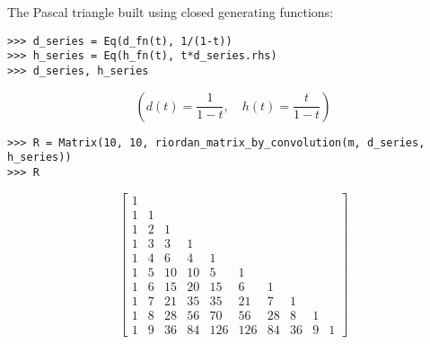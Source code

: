 \begin{example}
The Pascal triangle built using closed generating functions:
\begin{verbatim}
>>> d_series = Eq(d_fn(t), 1/(1-t))
>>> h_series = Eq(h_fn(t), t*d_series.rhs)
>>> d_series, h_series
\end{verbatim}
\begin{displaymath}
\left ( d{\left (t \right )} = \frac{1}{1-t}, \quad h{\left (t \right )} = \frac{t}{1-t}\right )
\end{displaymath}
\begin{verbatim}
>>> R = Matrix(10, 10, riordan_matrix_by_convolution(m, d_series, h_series))
>>> R
\end{verbatim}
\begin{displaymath}
\left[\begin{matrix}1 &   &   &   &   &   &   &   &   &  \\1 & 1 &   &   &   &   &   &   &   &  \\1 & 2 & 1 &   &   &   &   &   &   &  \\1 & 3 & 3 & 1 &   &   &   &   &   &  \\1 & 4 & 6 & 4 & 1 &   &   &   &   &  \\1 & 5 & 10 & 10 & 5 & 1 &   &   &   &  \\1 & 6 & 15 & 20 & 15 & 6 & 1 &   &   &  \\1 & 7 & 21 & 35 & 35 & 21 & 7 & 1 &   &  \\1 & 8 & 28 & 56 & 70 & 56 & 28 & 8 & 1 &  \\1 & 9 & 36 & 84 & 126 & 126 & 84 & 36 & 9 & 1\end{matrix}\right]
\end{displaymath}
\end{example}

